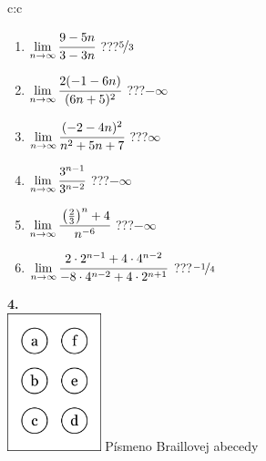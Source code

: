 \documentclass[10pt]{report}
\begin{document}
\begin{tabular}{c:c}
\begin{minipage}[c][104.5mm][t]{0.5\linewidth}
\begin{center}
\begin{minipage}{0.79\linewidth}
\begin{center}
\begin{varwidth}{\linewidth}
\begin{enumerate}
\normalsize
\item $\lim\limits_{n\to\infty}\cfrac{9-5n}{3-3n}$\quad \dotfill\; ???\;\dotfill \quad $\nicefrac{5}{3}$
\item $\lim\limits_{n\to\infty}\cfrac{2(-1-6n)}{(6n+5)^2}$\quad \dotfill\; ???\;\dotfill \quad $-\infty$
\item $\lim\limits_{n\to\infty}\cfrac{(-2-4n)^2}{n^2+5n+7}$\quad \dotfill\; ???\;\dotfill \quad $\infty$
\item $\lim\limits_{n\to\infty}\cfrac{3^{n-1}}{3^{n-2}}$\quad \dotfill\; ???\;\dotfill \quad $-\infty$
\item $\lim\limits_{n\to\infty}\cfrac{\left(\frac{2}{3}\right)^n +4}{n^{-6}}$\quad \dotfill\; ???\;\dotfill \quad $-\infty$
\item $\lim\limits_{n\to\infty}\cfrac{2\cdot 2^{n-1}+4\cdot 4^{n-2}}{-8\cdot 4^{n-2}+4\cdot 2^{n+1}}$\quad \dotfill\; ???\;\dotfill \quad $\nicefrac{-1}{4}$
\end{enumerate}
\end{varwidth}
\end{center}
\end{minipage}
\begin{minipage}{0.20\linewidth}
\begin{center}
{\Huge\bfseries 4.} \\[2mm]
\includegraphics[height=40mm]{../images/braille.png}
{\small Písmeno Braillovej abecedy}
\end{center}
\end{minipage}
\end{center}
\end{minipage}
%
\end{tabular}
\newpage
\thispagestyle{empty}
\end{document}
